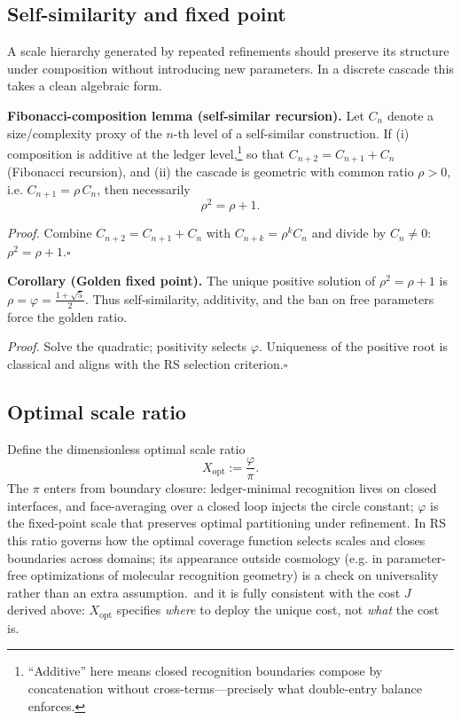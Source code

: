 \documentclass[11pt]{article}
\theoremstyle{definition}
\theoremstyle{remark}
\begin{document}
\subsection{Self-similarity and fixed point}
A scale hierarchy generated by repeated refinements should preserve its structure under composition without introducing new parameters. In a discrete cascade this takes a clean algebraic form.

\medskip
\noindent\textbf{Fibonacci-composition lemma (self-similar recursion).}
Let \(C_n\) denote a size/complexity proxy of the \(n\)-th level of a self-similar construction. If (i) composition is additive at the ledger level,\footnote{“Additive” here means closed recognition boundaries compose by concatenation without cross-terms—precisely what double-entry balance enforces.} so that \(C_{n+2}=C_{n+1}+C_n\) (Fibonacci recursion), and (ii) the cascade is geometric with common ratio \(\rho>0\), i.e. \(C_{n+1}=\rho\,C_n\), then necessarily
\[
  \rho^2=\rho+1.
\]

\emph{Proof.}
Combine \(C_{n+2}=C_{n+1}+C_n\) with \(C_{n+k}=\rho^k C_n\) and divide by \(C_n\neq 0\):
\(\rho^2=\rho+1\).\(\square\)
%
%

\medskip
\noindent\textbf{Corollary (Golden fixed point).}
The unique positive solution of \(\rho^2=\rho+1\) is
\(
  \rho=\varphi=\tfrac{1+\sqrt{5}}{2}.
\)
Thus self-similarity, additivity, and the ban on free parameters force the golden ratio.

\emph{Proof.}
Solve the quadratic; positivity selects \(\varphi\).
Uniqueness of the positive root is classical and aligns with the RS selection criterion.\(\square\)
%
%

\subsection{Optimal scale ratio}
Define the dimensionless optimal scale ratio
\[
  X_{\mathrm{opt}}:=\frac{\varphi}{\pi}.
\]
The \(\pi\) enters from boundary closure: ledger-minimal recognition lives on closed interfaces, and face-averaging over a closed loop injects the circle constant; \(\varphi\) is the fixed-point scale that preserves optimal partitioning under refinement. In RS this ratio governs how the optimal coverage function selects scales and closes boundaries across domains; its appearance outside cosmology (e.g. in parameter-free optimizations of molecular recognition geometry) is a check on universality rather than an extra assumption.\, %
and it is fully consistent with the cost \(J\) derived above: \(X_{\mathrm{opt}}\) specifies \emph{where} to deploy the unique cost, not \emph{what} the cost is.
\end{document}
